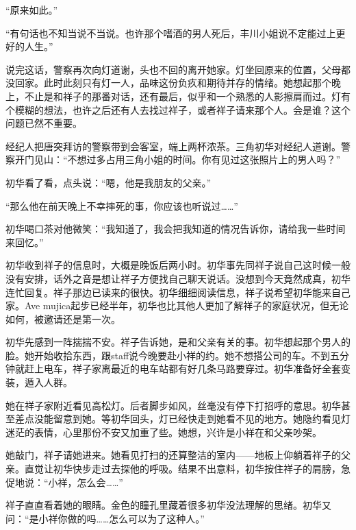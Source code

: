 \documentclass{article}
\begin{document}
“原来如此。”



“有句话也不知当说不当说。也许那个嗜酒的男人死后，丰川小姐说不定能过上更好的人生。”



说完这话，警察再次向灯道谢，头也不回的离开她家。灯坐回原来的位置，父母都没回家。此时此刻只有灯一人，品味这份负疚和期待并存的情绪。她想起那个晚上，不止是和祥子的那番对话，还有最后，似乎和一个熟悉的人影擦肩而过。灯有个模糊的想法，也许之后还有人去找过祥子，或者祥子请来那个人。会是谁？这个问题已然不重要。



经纪人把唐突拜访的警察带到会客室，端上两杯浓茶。三角初华对经纪人道谢。警察开门见山：“不想过多占用三角小姐的时间。你有见过这张照片上的男人吗？”



初华看了看，点头说：“嗯，他是我朋友的父亲。”



“那么他在前天晚上不幸摔死的事，你应该也听说过……”



初华喝口茶对他微笑：“我知道了，我会把我知道的情况告诉你，请给我一些时间来回忆。”



初华收到祥子的信息时，大概是晚饭后两小时。初华事先同祥子说自己这时候一般没有安排，话外之音是想让祥子方便找自己聊天说话。没想到今天竟然成真，初华连忙回复。祥子那边已读来的很快。初华细细阅读信息，祥子说希望初华能来自己家。Ave mujica起步已经半年，初华也比其他人更加了解祥子的家庭状况，但无论如何，被邀请还是第一次。



初华先感到一阵揣揣不安。祥子告诉她，是和父亲有关的事。初华想起那个男人的脸。她开始收拾东西，跟staff说今晚要赴小祥的约。她不想搭公司的车。不到五分钟就赶上电车，祥子家离最近的电车站都有好几条马路要穿过。初华准备好全套变装，遁入人群。



她在祥子家附近看见高松灯。后者脚步如风，丝毫没有停下打招呼的意思。初华甚至差点没能留意到她。等初华回头，灯已经快走到她看不见的地方。她隐约看见灯迷茫的表情，心里那份不安又加重了些。她想，兴许是小祥在和父亲吵架。



她敲门，祥子请她进来。她看见打扫的还算整洁的室内——地板上仰躺着祥子的父亲。直觉让初华快步走过去探他的呼吸。结果不出意料，初华按住祥子的肩膀，急促地说：“小祥，怎么会……”



祥子直直看着她的眼睛。金色的瞳孔里藏着很多初华没法理解的思绪。初华又问：“是小祥你做的吗……怎么可以为了这种人。”
\end{document}
